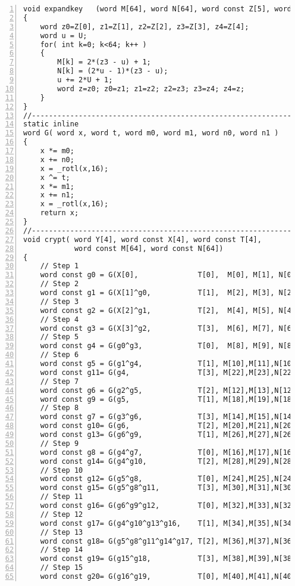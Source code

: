 \documentclass[a4paper,oneside,english]{amsart}
\numberwithin{equation}{section}
\numberwithin{figure}{section}
\begin{document}
{\footnotesize }
\begin{lstlisting}[basicstyle={\scriptsize\ttfamily},numbers=left,tabsize=4]
void expandkey   (word M[64], word N[64], word const Z[5], word U)
{
    word z0=Z[0], z1=Z[1], z2=Z[2], z3=Z[3], z4=Z[4];
    word u = U;
    for( int k=0; k<64; k++ )
    {
        M[k] = 2*(z3 - u) + 1;
        N[k] = (2*u - 1)*(z3 - u);
        u += 2*U + 1;
        word z=z0; z0=z1; z1=z2; z2=z3; z3=z4; z4=z;
    }
}
//----------------------------------------------------------------------
static inline 
word G( word x, word t, word m0, word m1, word n0, word n1 )
{
    x *= m0;
    x += n0;
    x = _rotl(x,16);
    x ^= t;
    x *= m1;
    x += n1;
    x = _rotl(x,16);
    return x;
}
//----------------------------------------------------------------------
void crypt( word Y[4], word const X[4], word const T[4], 
            word const M[64], word const N[64])
{   
    // Step 1
    word const g0 = G(X[0],              T[0],  M[0], M[1], N[0], N[1]);
    // Step 2
    word const g1 = G(X[1]^g0,           T[1],  M[2], M[3], N[2], N[3]);
    // Step 3
    word const g2 = G(X[2]^g1,           T[2],  M[4], M[5], N[4], N[5]);
    // Step 4
    word const g3 = G(X[3]^g2,           T[3],  M[6], M[7], N[6], N[7]);
    // Step 5
    word const g4 = G(g0^g3,             T[0],  M[8], M[9], N[8], N[9]);
    // Step 6
    word const g5 = G(g1^g4,             T[1], M[10],M[11],N[10],N[11]);
    word const g11= G(g4,                T[3], M[22],M[23],N[22],N[23]);
    // Step 7
    word const g6 = G(g2^g5,             T[2], M[12],M[13],N[12],N[13]);
    word const g9 = G(g5,                T[1], M[18],M[19],N[18],N[19]);
    // Step 8
    word const g7 = G(g3^g6,             T[3], M[14],M[15],N[14],N[15]);
    word const g10= G(g6,                T[2], M[20],M[21],N[20],N[21]);
    word const g13= G(g6^g9,             T[1], M[26],M[27],N[26],N[27]);
    // Step 9
    word const g8 = G(g4^g7,             T[0], M[16],M[17],N[16],N[17]);
    word const g14= G(g4^g10,            T[2], M[28],M[29],N[28],N[29]);
    // Step 10
    word const g12= G(g5^g8,             T[0], M[24],M[25],N[24],N[25]);
    word const g15= G(g5^g8^g11,         T[3], M[30],M[31],N[30],N[31]);
    // Step 11
    word const g16= G(g6^g9^g12,         T[0], M[32],M[33],N[32],N[33]);
    // Step 12
    word const g17= G(g4^g10^g13^g16,    T[1], M[34],M[35],N[34],N[35]);
    // Step 13
    word const g18= G(g5^g8^g11^g14^g17, T[2], M[36],M[37],N[36],N[37]);
    // Step 14
    word const g19= G(g15^g18,           T[3], M[38],M[39],N[38],N[39]);
    // Step 15
    word const g20= G(g16^g19,           T[0], M[40],M[41],N[40],N[41]);

\end{lstlisting}
\end{document}
